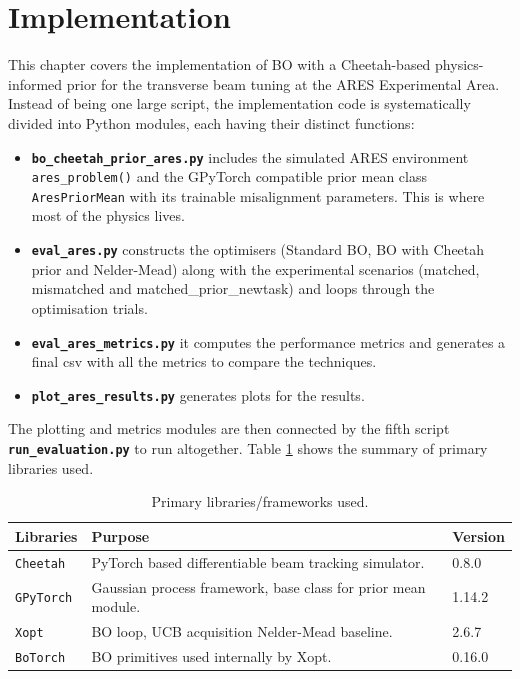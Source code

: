 \section{Implementation}	\label{a:ab_rts_en}

This chapter covers the implementation of BO with a Cheetah-based physics-informed prior for the transverse beam tuning at the ARES Experimental Area. 
Instead of being one large script, the implementation code is systematically divided into Python modules, each having their distinct functions:
\begin{itemize}
    \item \textbf{\texttt{bo\_cheetah\_prior\_ares.py}} includes the simulated ARES environment \texttt{ares\_problem()} and the GPyTorch compatible prior mean class \texttt{AresPriorMean} with its trainable  misalignment parameters. This is where most of the physics lives.
    \item \textbf{\texttt{eval\_ares.py}} constructs the optimisers (Standard BO, BO with Cheetah prior and Nelder-Mead) along with the experimental scenarios (matched, mismatched and matched\_prior\_newtask) and loops through the optimisation trials. 
    \item \textbf{\texttt{eval\_ares\_metrics.py}} it computes the performance metrics and generates a final csv with all the metrics to compare the techniques. 
    \item \textbf{\texttt{plot\_ares\_results.py}} generates plots for the results. 
\end{itemize}

The plotting and metrics modules are then connected by the fifth script \textbf{\texttt{run\_evaluation.py}} to run altogether. Table \ref{table:libraries} shows the summary of primary libraries used. 

\begin{table} [htbp]
    \centering
    \small
    \begin{tabular}{p{2.5cm} p{5.5cm} p{1.5cm}}
        \toprule
        \textbf{Libraries} & \textbf{Purpose} & \textbf{Version} \\
        \midrule
        \texttt{Cheetah} & PyTorch based differentiable beam tracking simulator. & 0.8.0 \\
        \texttt{GPyTorch} & Gaussian process framework, base class for prior mean module. & 1.14.2 \\ 
        \texttt{Xopt} & BO loop, UCB acquisition Nelder-Mead baseline. & 2.6.7 \\ 
        \texttt{BoTorch} & BO primitives used internally by Xopt. & 0.16.0 \\ 
        \bottomrule
    \end{tabular}
    \caption{Primary libraries/frameworks used.}
    \label{table:libraries}
\end{table}

